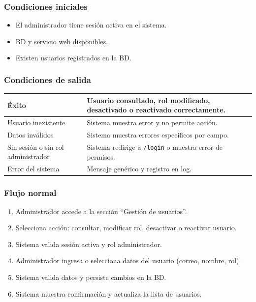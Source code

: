 \documentclass[12pt,a4paper]{article}
\begin{document}
\subsubsection*{Condiciones iniciales}
\begin{itemize}[label=--]
    \item El administrador tiene sesión activa en el sistema.
    \item BD y servicio web disponibles.
    \item Existen usuarios registrados en la BD.
\end{itemize}

\subsubsection*{Condiciones de salida}
\begin{longtable}{|l|p{10cm}|}
    \hline
    Éxito                              & Usuario consultado, rol modificado, desactivado o reactivado correctamente. \\ \hline
    Usuario inexistente                & Sistema muestra error y no permite acción.                                  \\ \hline
    Datos inválidos                    & Sistema muestra errores específicos por campo.                              \\ \hline
    Sin sesión o sin rol administrador & Sistema redirige a \texttt{/login} o muestra error de permisos.             \\ \hline
    Error del sistema                  & Mensaje genérico y registro en log.                                         \\ \hline
\end{longtable}

\subsubsection*{Flujo normal}
\begin{enumerate}[label=FN-\arabic*]
    \item Administrador accede a la sección “Gestión de usuarios”.
    \item Selecciona acción: consultar, modificar rol, desactivar o reactivar usuario.
    \item Sistema valida sesión activa y rol administrador.
    \item Administrador ingresa o selecciona datos del usuario (correo, nombre, rol).
    \item Sistema valida datos y persiste cambios en la BD.
    \item Sistema muestra confirmación y actualiza la lista de usuarios.
\end{enumerate}
\end{document}

